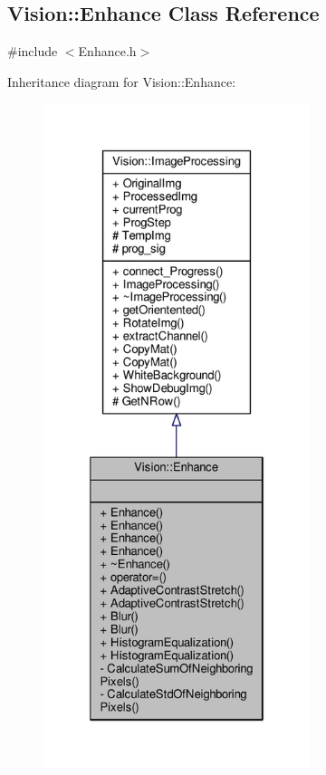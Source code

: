 \hypertarget{class_vision_1_1_enhance}{}\subsection{Vision\+:\+:Enhance Class Reference}
\label{class_vision_1_1_enhance}


{\ttfamily \#include $<$Enhance.\+h$>$}



Inheritance diagram for Vision\+:\+:Enhance\+:
\nopagebreak
\begin{figure}[H]
\begin{center}
\leavevmode
\includegraphics[height=550pt]{class_vision_1_1_enhance__inherit__graph}
\end{center}
\end{figure}


